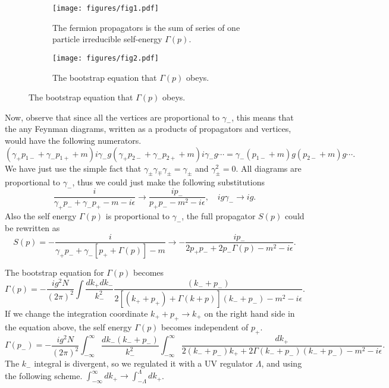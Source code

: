 \documentclass{article}
\begin{document}
\FloatBarrier
\begin{figure}[h]
	\begin{subfigure}[t]{.6\textwidth}
		\centering
		\captionsetup{width=.8\linewidth}
		\texttt{[image: figures/fig1.pdf]}
		\caption{The fermion propagators is the sum of series of one particle irreducible self-energy $\Gamma(p)$.\label{fig1}}
	\end{subfigure}%
	\hfill
	\begin{subfigure}[t]{.4\textwidth}
		\centering
		\texttt{[image: figures/fig2.pdf]}
		\caption{The bootstrap equation that $\Gamma(p)$ obeys. \label{fig2}}
	\end{subfigure}
\end{figure}

Now, observe that since all the vertices are proportional to $\gamma_{-}$, this means that the any Feynman diagrams, written as a products of propagators and vertices, would have the following numerators.
\[
	(\gamma_{+}p_{1-}+ \gamma_{-}p_{1+} + m)i\gamma_{-}g(\gamma_{+}p_{2-}+ \gamma_{-}p_{2+} + m)i\gamma_{-}g\cdots = \gamma_{-}\left(p_{1-} + m\right)g\left(p_{2-} + m\right)g\cdots .
\]
We have just use the simple fact that $\gamma_{\pm}\gamma_{\mp}\gamma_{\pm} = \gamma_{\pm}$ and $\gamma_{\pm}^2= 0$. All diagrams are proportional to $\gamma_{-}$, thus we could just make the following substitutions
\[
	\frac{i}{\gamma_{+}p_{-} + \gamma_{-}p_{+} - m - i\epsilon}\rightarrow\frac{ip_{-}}{p_{+}p_{-} - m^2 - i\epsilon}, \quad ig\gamma_{-}\rightarrow ig.
\]
Also the self energy $\Gamma(p)$ is proportional to $\gamma_{-}$, the full propagator $S(p)$ could be rewritten as
\[
	S(p) = -\frac{i}{\gamma_{+}p_{-} + \gamma_{-}[p_{+} + \Gamma(p)] -m} \rightarrow
	-\frac{ip_{-}}{2p_{+}p_{-} + 2p_{-}\Gamma(p) -m^{2} -i\epsilon}.
\]

The bootstrap equation for $\Gamma(p)$ becomes
\[
	\Gamma(p) = -\frac{ig^2N}{(2\pi)^{2}}\int\frac{dk_{+}dk_{-}}{k_{-}^{2}}\frac{\left(k_{-} + p_{-}\right)}{2\left[(k_{+} +p_{+})+ \Gamma(k+p)\right](k_{-}+ p_{-}) - m^{2} -i\epsilon }.
\]
If we change the integration coordinate $k_{+} + p_{+}\rightarrow k_{+}$ on the right hand side in the equation above, the self energy $\Gamma(p)$ becomes independent of  $p_{+}$.
\[
	\Gamma(p_{-}) =-\frac{ig^2N}{(2\pi)^{2}}\int_{-\infty}^{\infty} \frac{dk_{-}(k_{-} + p_{-})}{k_{-}^{2}} \int_{-\infty}^{\infty} \frac{dk_{+}}{2(k_{-} + p_{-})k_{+} + 2\Gamma(k_{-} + p_{-})(k_{-}+p_{-})-m^{2} -i\epsilon}.
\]
The $k_{-}$ integral is divergent, so we regulated it with a UV regulator $\Lambda$, and using the following scheme.
$\int_{-\infty}^{\infty}dk_{+} \rightarrow \int_{-\Lambda}^{\Lambda}dk_{+}$.
\end{document}
